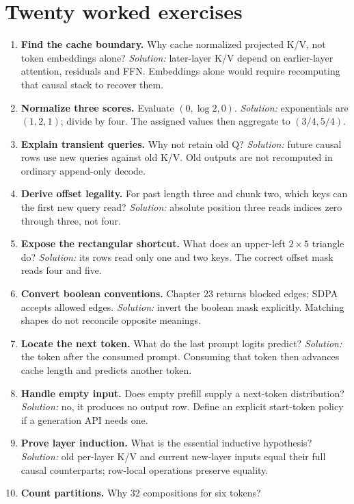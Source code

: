 \section{Twenty worked exercises}
\label{evod35:exercises}
\begin{enumerate}
\item \textbf{Find the cache boundary.} Why cache normalized projected K/V,
not token embeddings alone? \emph{Solution:} later-layer K/V depend on
earlier-layer attention, residuals and FFN. Embeddings alone would require
recomputing that causal stack to recover them.
\item \textbf{Normalize three scores.} Evaluate $(0,\log2,0)$.
\emph{Solution:} exponentials are $(1,2,1)$; divide by four. The assigned
values then aggregate to $(3/4,5/4)$.
\item \textbf{Explain transient queries.} Why not retain old Q?
\emph{Solution:} future causal rows use new queries against old K/V. Old
outputs are not recomputed in ordinary append-only decode.
\item \textbf{Derive offset legality.} For past length three and chunk two,
which keys can the first new query read? \emph{Solution:} absolute position
three reads indices zero through three, not four.
\item \textbf{Expose the rectangular shortcut.} What does an upper-left
$2\times5$ triangle do? \emph{Solution:} its rows read only one and two keys.
The correct offset mask reads four and five.
\item \textbf{Convert boolean conventions.} Chapter 23 returns blocked
edges; SDPA accepts allowed edges. \emph{Solution:} invert the boolean mask
explicitly. Matching shapes do not reconcile opposite meanings.
\item \textbf{Locate the next token.} What do the last prompt logits predict?
\emph{Solution:} the token after the consumed prompt. Consuming that token
then advances cache length and predicts another token.
\item \textbf{Handle empty input.} Does empty prefill supply a next-token
distribution? \emph{Solution:} no, it produces no output row. Define an
explicit start-token policy if a generation API needs one.
\item \textbf{Prove layer induction.} What is the essential inductive
hypothesis? \emph{Solution:} old per-layer K/V and current new-layer inputs
equal their full causal counterparts; row-local operations preserve equality.
\item \textbf{Count partitions.} Why 32 compositions for six tokens?

\end{enumerate}
